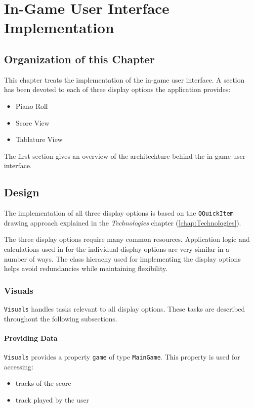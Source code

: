 \chapter[In-Game User Interface Implementation \textsuperscript{Novotny}]{In-Game User Interface Implementation}
\label{chap:In-Game User Interface}

\section{Organization of this Chapter}
This chapter treats the implementation of the in-game user interface. A section has been devoted to each of three display options the application provides:

\begin {itemize}
	\item {Piano Roll}
	\item {Score View}
	\item {Tablature View}
\end {itemize}

The first section gives an overview of the architechture behind the in-game user interface.

\section{Design}
The implementation of all three display options is based on the {\tt QQuickItem} drawing approach explained in the \textit{Technologies} chapter (\ref{chap:Technologies}). 

The three display options require many common resources. Application logic and calculations used in for the individual display options are very similar in a number of ways. The class hierachy used for implementing the display options helps avoid redundancies while maintaining flexibility.

\subsection{Visuals}
{\tt Visuals} handles tasks relevant to all display options. These tasks are described throughout the following subsections.

\subsubsection{Providing Data}
{\tt Visuals} provides a property {\tt game} of type {\tt MainGame}.
This property is used for accessing:
\begin {itemize}
	\item {tracks of the score}
	\item {track played by the user}
\end {itemize}

